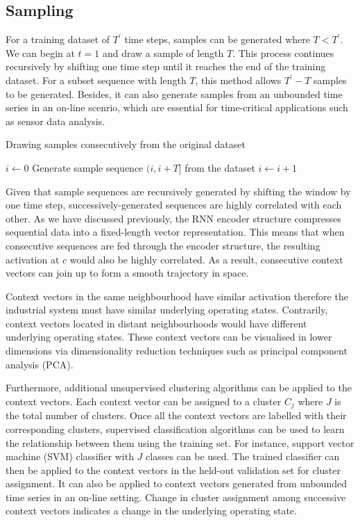 \documentclass[runningheads]{llncs}
\begin{document}
\subsection{Sampling}

For a training dataset of \(T^\prime\) time steps, samples can be generated where \(T < T^\prime\). We can begin at \(t=1\) and draw a sample of length \(T\). This process continues recursively by shifting one time step until it reaches the end of the training dataset. For a subset sequence with length \(T\), this method allows \(T^\prime - T\) samples to be generated. Besides, it can also generate samples from an unbounded time series in an on-line scenrio, which are essential for time-critical applications such as sensor data analysis.

\begin{algorithm}[H]
	\label{consecutive_sampling}
	\caption{Drawing samples consecutively from the original dataset}
	\(i\leftarrow 0\) \;
	 {
		Generate sample sequence \((i, i+T]\) from the dataset\;
		\(i\leftarrow i+1\)\;
	}
\end{algorithm}

Given that sample sequences are recursively generated by shifting the window by one time step, successively-generated sequences are highly correlated with each other. As we have discussed previously, the RNN encoder structure compresses sequential data into a fixed-length vector representation. This means that when consecutive sequences are fed through the encoder structure, the resulting activation at \(c\) would also be highly correlated. As a result, consecutive context vectors can join up to form a smooth trajectory in space.

Context vectors in the same neighbourhood have similar activation therefore the industrial system must have similar underlying operating states. Contrarily, context vectors located in distant neighbourhoods would have different underlying operating states. These context vectors can be visualised in lower dimensions via dimensionality reduction techniques such as principal component analysis (PCA).

Furthermore, additional unsupervised clustering algorithms can be applied to the context vectors. Each context vector can be assigned to a cluster \(C_j\) where \(J\) is the total number of clusters. Once all the context vectors are labelled with their corresponding clusters, supervised classification algorithms can be used to learn the relationship between them using the training set. For instance, support vector machine (SVM) classifier with \(J\) classes can be used. The trained classifier can then be applied to the context vectors in the held-out validation set for cluster assignment. It can also be applied to context vectors generated from unbounded time series in an on-line setting. Change in cluster assignment among successive context vectors indicates a change in the underlying operating state.
\end{document}
